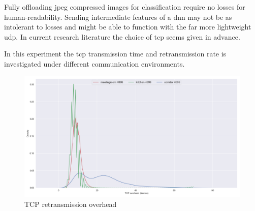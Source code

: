 Fully offloading \gls{jpeg} compressed images for classification require no losses for human-readability. Sending intermediate features of a \gls{dnn} may not be as intolerant to losses and might be able to function with the far more lightweight \gls{udp}. In current research literature the choice of \gls{tcp} seems given in advance.  

In this experiment the \gls{tcp} transmission time and retransmission rate is investigated under different communication environments. 

\begin{figure}
	\centering
	\includegraphics[width=\linewidth]{figures/tcp/tcpoverhead}
	\caption[TCP retransmission overhead]{TCP retransmission overhead}
\end{figure}